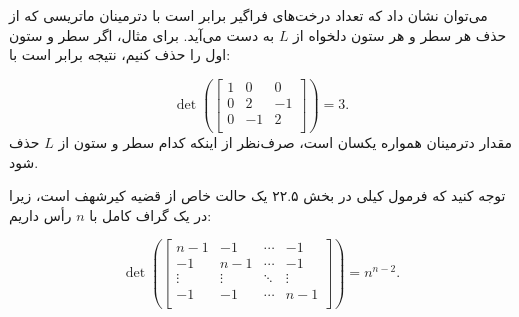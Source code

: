 می‌توان نشان داد که
تعداد درخت‌های فراگیر برابر است با
دترمینان ماتریسی که از حذف
هر سطر و هر ستون دلخواه از $L$ به دست می‌آید.
برای مثال، اگر سطر و ستون اول را حذف کنیم،
نتیجه برابر است با:

\[ \det(
\begin{bmatrix}
  1 & 0 & 0 \\
  0 & 2 & -1 \\
  0 & -1 & 2 \\
 \end{bmatrix}
) =3.\]
مقدار دترمینان همواره یکسان است،
صرف‌نظر از اینکه کدام سطر و ستون از $L$ حذف شود.

توجه کنید که فرمول کیلی در بخش ۲۲.۵ یک
حالت خاص از قضیه کیرشهف است،
زیرا در یک گراف کامل با $n$ رأس داریم:

\[ \det(
\begin{bmatrix}
  n-1 & -1 & \cdots & -1 \\
  -1 & n-1 & \cdots & -1 \\
  \vdots & \vdots & \ddots & \vdots \\
  -1 & -1 & \cdots & n-1 \\
 \end{bmatrix}
) =n^{n-2}.\]